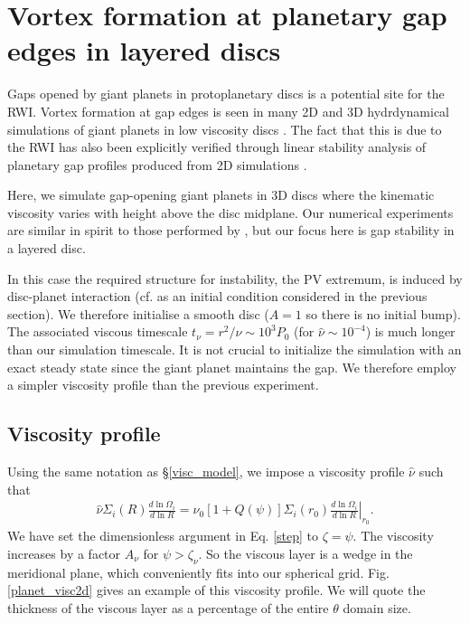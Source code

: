 \section{Vortex formation at planetary gap edges in layered discs}
Gaps opened by giant planets in protoplanetary discs is a potential site for 
the RWI. Vortex formation at gap edges is seen in many 
2D and 3D hydrdynamical simulations of giant planets in low viscosity discs 
\citep{valborro07,lin10,lin11a,lin12}. The fact that this is due to the RWI has also been explicitly  
verified through linear stability analysis of planetary gap profiles 
produced from 2D simulations \citep{valborro07,lin10}. 

Here, we simulate gap-opening giant planets in 3D discs where the kinematic viscosity  
varies with height above the disc midplane. Our numerical experiments are similar
in spirit to those performed by \cite{pierens10}, but our focus here is gap stability in a 
layered disc. 

In this case the required structure for instability, the PV extremum, 
is induced by disc-planet interaction (cf. as an initial condition considered in the
previous section). We therefore initialise a 
smooth disc ($A=1$ so there is no initial bump). The associated viscous timescale
$t_\nu=r^2/\nu\sim 10^3P_0$ (for $\hat{\nu}\sim 10^{-4}$) is much
longer than our simulation timescale. It is not crucial to initialize
the simulation with an exact steady state since the giant planet
maintains the gap. We therefore employ a simpler viscosity profile than
the previous experiment.   

\subsection{Viscosity profile}\label{planet_visc_mode}
Using the same notation as \S\ref{visc_model}, we impose a viscosity
profile $\hat{\nu}$ such that 
\begin{align}\label{planet_visc_profile}
  \hat{\nu}\Sigma_i(R)\frac{d\ln{\Omega_i}}{d\ln{R}} =
  \hat{\nu}_0\left[1+Q(\psi)\right]\Sigma_i(r_0)\left.\frac{d\ln{\Omega_i}}{d\ln{R}}\right|_{r_0}.      
\end{align}
We have set the dimensionless argument in Eq. \ref{step} to
$\zeta=\psi$. The viscosity increases by a factor $A_\nu$ for 
$\psi > \zeta_\nu$. So the viscous layer is 
a wedge in the meridional plane, which conveniently fits into our
spherical grid. Fig. \ref{planet_visc2d} gives an example of this
viscosity profile. We will quote the thickness of the viscous layer as a 
percentage of the entire $\theta$ domain size. 

